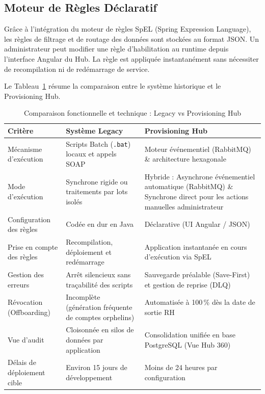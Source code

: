 \subsection{Moteur de Règles Déclaratif}
Grâce à l'intégration du moteur de règles SpEL (Spring Expression Language), les règles de filtrage et de routage des données sont stockées au format JSON. Un administrateur peut modifier une règle d'habilitation au runtime depuis l'interface Angular du Hub. La règle est appliquée instantanément sans nécessiter de recompilation ni de redémarrage de service.

Le Tableau~\ref{tab:comparaison_legacy_hub} résume la comparaison entre le système historique et le Provisioning Hub.

\begin{table}[H]
    \centering
    \caption{Comparaison fonctionnelle et technique : Legacy vs Provisioning Hub}
    \label{tab:comparaison_legacy_hub}
    \begin{tabular}{p{3.8cm}p{5.5cm}p{5.5cm}}
        \toprule
        \textbf{Critère} & \textbf{Système Legacy} & \textbf{Provisioning Hub} \\
        \midrule
        Mécanisme d'exécution & Scripts Batch (\texttt{.bat}) locaux et appels SOAP & Moteur événementiel (RabbitMQ) \& architecture hexagonale \\
        Mode d'exécution & Synchrone rigide ou traitements par lots isolés & Hybride : Asynchrone événementiel automatique (RabbitMQ) \& Synchrone direct pour les actions manuelles administrateur \\
        Configuration des règles & Codée en dur en Java & Déclarative (UI Angular / JSON) \\
        Prise en compte des règles & Recompilation, déploiement et redémarrage & Application instantanée en cours d'exécution via SpEL \\
        Gestion des erreurs & Arrêt silencieux sans traçabilité des scripts & Sauvegarde préalable (Save-First) et gestion de reprise (DLQ) \\
        Révocation (Offboarding) & Incomplète (génération fréquente de comptes orphelins) & Automatisée à 100\,\% dès la date de sortie RH \\
        Vue d'audit & Cloisonnée en silos de données par application & Consolidation unifiée en base PostgreSQL (Vue Hub 360) \\
        Délais de déploiement cible & Environ 15 jours de développement & Moins de 24 heures par configuration \\
        \bottomrule
    \end{tabular}
\end{table}

